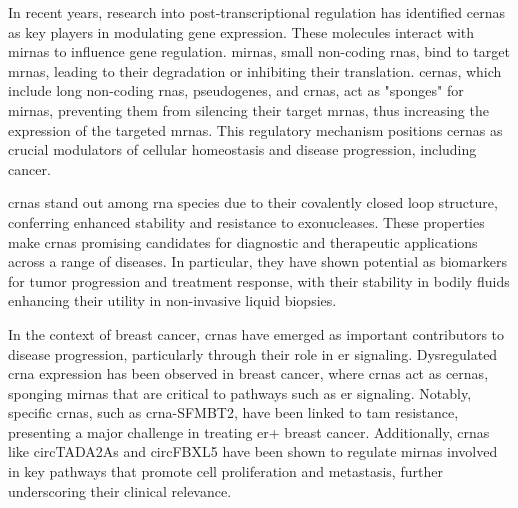 In recent years, research into post-transcriptional regulation has identified
\glspl{cerna} as key players in modulating gene
expression\supercite{salmena_cerna_2011,tay_multilayered_2014}.
These molecules interact with \glspl{mirna} to influence gene
regulation\supercite{salmena_cerna_2011,li_long_2017}.
\Glspl{mirna}, small
non-coding \glspl{rna}, bind to target \glspl{mrna}, leading to their
degradation or inhibiting their
translation\supercite{salmena_cerna_2011,tay_multilayered_2014}. \Glspl{cerna},
which include long non-coding \glspl{rna}, pseudogenes, and \glspl{crna}, act
as "sponges" for \glspl{mirna}, preventing them from silencing their target
\glspl{mrna}, thus increasing the expression of the targeted
\glspl{mrna}\supercite{salmena_cerna_2011,poliseno_coding-independent_2010}.
This regulatory mechanism positions \glspl{cerna} as crucial modulators of
cellular homeostasis and disease progression, including
cancer\supercite{salmena_cerna_2011,vo_landscape_2019}.

\Glspl{crna} stand out among \gls{rna} species due to their covalently closed
loop structure, conferring enhanced stability and resistance to
exonucleases\supercite{vo_landscape_2019}.
These properties make \glspl{crna} promising candidates for diagnostic and
therapeutic applications across a range of
diseases\supercite{ma_circular_2020,hoque_exploring_2023,wilusz_circular_2017}.
In particular, they have shown potential as biomarkers for tumor progression
and treatment response, with their stability in bodily fluids enhancing their
utility in non-invasive liquid
biopsies\supercite{bao_prognostic_2020,zhang_circular_2018}.

In the context of breast cancer, \glspl{crna} have emerged as important
contributors to disease progression, particularly through their role in
\gls{er} signaling.
Dysregulated \gls{crna} expression has been observed in breast cancer, where
\glspl{crna} act as \glspl{cerna}, sponging \glspl{mirna} that are critical to
pathways such as \gls{er}
signaling\supercite{nair_circular_2016,xu_circrna_2022}.
Notably, specific \glspl{crna}, such as \gls{crna}-SFMBT2, have been linked to
\gls{tam} resistance, presenting a major challenge in treating \gls{er+} breast
cancer\supercite{li_circrna-sfmbt2_2023}.
Additionally, \glspl{crna} like circTADA2As and circFBXL5 have been shown to
regulate \glspl{mirna} involved in key pathways that promote cell proliferation
and metastasis, further underscoring their clinical
relevance\supercite{xu_circtada2as_2019,gao_hsa_circrna_0006528_2019}.

